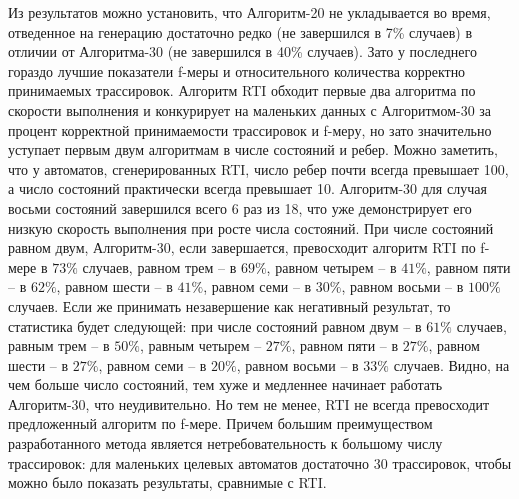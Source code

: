 \documentclass[times,specification,annotation]{itmo-student-thesis}
\begin{document}
Из результатов можно установить, что Алгоритм-20 не укладывается во время, отведенное на генерацию достаточно редко (не завершился в 7\% случаев) в отличии от Алгоритма-30 (не завершился в
40\% случаев).
Зато у последнего гораздо лучшие показатели f-меры и относительного количества корректно принимаемых трассировок. Алгоритм RTI обходит первые два алгоритма по скорости выполнения и 
конкурирует на маленьких данных с Алгоритмом-30 за процент корректной принимаемости трассировок и f-меру, но зато значительно уступает первым двум алгоритмам в
числе состояний и ребер. Можно заметить, что у автоматов, сгенерированных RTI, число ребер почти всегда превышает 100, а число состояний практически всегда превышает 10.
Алгоритм-30 для случая восьми состояний завершился всего 6 раз из 18, что уже демонстрирует его низкую скорость выполнения при росте числа состояний.
При числе состояний равном двум, Алгоритм-30, если завершается, превосходит алгоритм RTI по f-мере в $73\%$ случаев, равном трем -- в $69\%$, равном четырем -- в $41\%$,
равном пяти -- в $62\%$, равном шести -- в $41\%$, равном семи -- в $30\%$, равном восьми -- в $100\%$ случаев. Если же принимать незавершение как негативный результат, то статистика
будет следующей: при числе состояний равном двум -- в $61\%$ случаев, равным трем -- в $50\%$, равным четырем -- $27\%$,
равном пяти -- в $27\%$, равном шести -- в $27\%$, равном семи -- в $20\%$, равном восьми -- в $33\%$ случаев. Видно, на чем больше число состояний, тем хуже и медленнее начинает работать
Алгоритм-30, что неудивительно. Но тем не менее, RTI не всегда превосходит предложенный алгоритм по f-мере. Причем большим преимуществом разработанного метода является нетребовательность
к большому числу трассировок: для маленьких целевых автоматов достаточно 30 трассировок, чтобы можно было показать результаты, сравнимые с RTI.
\end{document}
